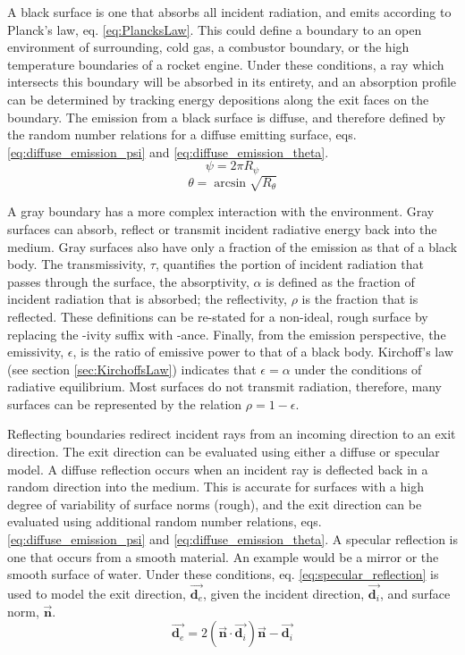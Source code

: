 A black surface is one that absorbs all incident radiation, and emits according to Planck's law, eq. \ref{eq:PlancksLaw}. 
This could define a boundary to an open environment of surrounding, cold gas, a combustor boundary, or the high temperature boundaries of a rocket engine. 
Under these conditions, a ray which intersects this boundary will be absorbed in its entirety, and an absorption profile can be determined by tracking energy depositions along the exit faces on the boundary. The emission from a black surface is diffuse, and therefore defined by the random number relations for a diffuse emitting surface, eqs. \ref{eq:diffuse_emission_psi} and \ref{eq:diffuse_emission_theta}.
\begin{equation}
    \psi{}=2\pi{}R_\psi
    \label{eq:diffuse_emission_psi}
\end{equation}
\begin{equation}
    \theta = \arcsin{\sqrt{R_\theta}}
    \label{eq:diffuse_emission_theta}
\end{equation}

A gray boundary has a more complex interaction with the environment. Gray surfaces can absorb, reflect or transmit incident radiative energy back into the medium. Gray surfaces also have only a fraction of the emission as that of a black body.
The transmissivity, $\tau{}$, quantifies the portion of incident radiation that passes through the surface, the absorptivity, $\alpha$ is defined as the fraction of incident radiation that is absorbed; the reflectivity, $\rho$ is the fraction that is reflected. These definitions can be re-stated for a non-ideal, rough surface by replacing the -ivity suffix with -ance. 
Finally, from the emission perspective, the emissivity, $\epsilon$, is the ratio of emissive power to that of a black body.  Kirchoff's law (see section \ref{sec:KirchoffsLaw}) indicates that $\epsilon{}=\alpha{}$ under the conditions of radiative equilibrium.
Most surfaces do not transmit radiation, therefore, many surfaces can be represented by the relation $\rho{}=1-\epsilon$. 

Reflecting boundaries redirect incident rays from an incoming direction to an exit direction. 
The exit direction can be evaluated using either a diffuse or specular model. 
A diffuse reflection occurs when an incident ray is deflected back in a random direction into the medium. This is accurate for surfaces with a high degree of variability of surface norms (rough), and the exit direction can be evaluated using additional random number relations, eqs. \ref{eq:diffuse_emission_psi} and \ref{eq:diffuse_emission_theta}.
A specular reflection is one that occurs from a smooth material. 
An example would be a mirror or the smooth surface of water. Under these conditions, eq. \ref{eq:specular_reflection} is used to model the exit direction, $\Vec{\textbf{d}_{e}}$, given the incident direction, $\Vec{\textbf{d}_i}$, and surface norm, $\vec{\textbf{n}}$.
\begin{equation}
    \Vec{\textbf{d}_e}=2(\Vec{\textbf{n}}\cdot\Vec{\textbf{d}_i})\Vec{\textbf{n}} -\Vec{\textbf{d}_i}
    \label{eq:specular_reflection}
\end{equation}
 


